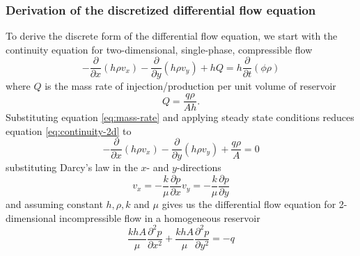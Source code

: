\subsubsection{Derivation of the discretized differential flow equation} %
\label{ssub:derivation}
To derive the discrete form of the differential flow equation, we  start with the continuity equation for two-dimensional, single-phase, compressible flow \citet{Peaceman1977Fundamentals}
\begin{equation}
    \label{eq:continuity-2d}
    - \frac{\partial}{\partial x} \left( h\rho v_x \right) - \frac{\partial}{\partial y} \left( h\rho v_y \right) + hQ = h \frac{\partial }{\partial t} \left( \phi \rho \right)
\end{equation}
where $Q$ is the mass rate of injection/production per unit volume of reservoir
\begin{equation}
    \label{eq:mass-rate}
    Q = \frac{q\rho}{Ah}.
\end{equation}
Substituting equation \eqref{eq:mass-rate} and applying steady state conditions reduces equation \eqref{eq:continuity-2d} to
\begin{equation}
    - \frac{\partial}{\partial x} \left( h\rho v_x \right) - \frac{\partial}{\partial y} \left( h\rho v_y \right) + \frac{q\rho}{A} = 0
\end{equation}
substituting Darcy's law in the $x$- and $y$-directions \citet{Peaceman1977Fundamentals}
\begin{subequations}
    \begin{equation}
        v_x = -\frac{k}{\mu} \frac{\partial p}{\partial x}
    \end{equation}
    \begin{equation}
        v_y = -\frac{k}{\mu} \frac{\partial p}{\partial y}
    \end{equation}
\end{subequations}
and assuming constant $h,\rho,k$ and $\mu$ gives us the differential flow equation for 2-dimensional incompressible flow in a homogeneous reservoir
\begin{equation}
    \label{eq:differential-flow}
    \frac{khA}{\mu} \frac{\partial^2 p}{\partial x^2}  + \frac{khA}{\mu} \frac{\partial^2 p}{\partial y^2} = -q
\end{equation}

